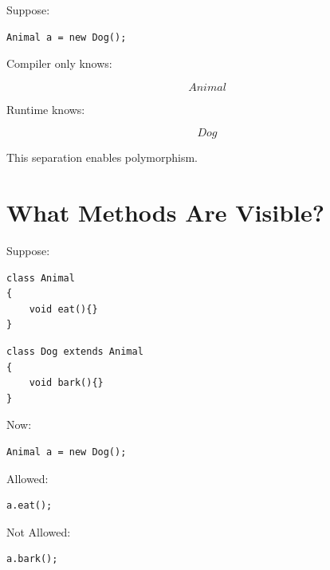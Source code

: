 \documentclass[11pt,a4paper]{book}
\begin{document}
Suppose:

\begin{verbatim}
Animal a = new Dog();
\end{verbatim}


Compiler only knows:

\[
Animal
\]


Runtime knows:

\[
Dog
\]


This separation enables polymorphism.


\section{What Methods Are Visible?}

Suppose:

\begin{verbatim}
class Animal
{
    void eat(){}
}
\end{verbatim}


\begin{verbatim}
class Dog extends Animal
{
    void bark(){}
}
\end{verbatim}


Now:

\begin{verbatim}
Animal a = new Dog();
\end{verbatim}


Allowed:

\begin{verbatim}
a.eat();
\end{verbatim}


Not Allowed:

\begin{verbatim}
a.bark();
\end{verbatim}
\end{document}
